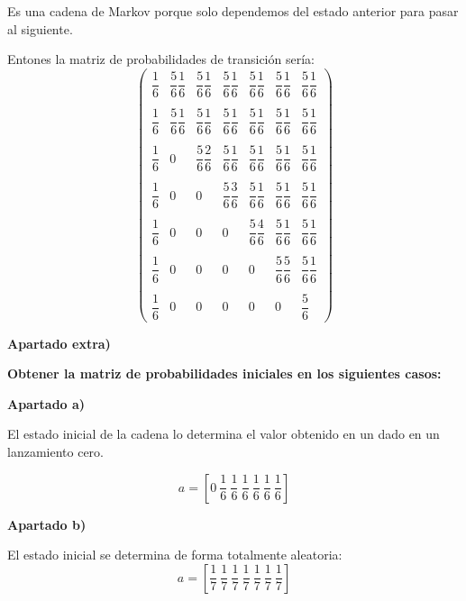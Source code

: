 \documentclass[openany]{book}
\begin{document}
\begin{exercise}
    Es una cadena de Markov porque solo dependemos del estado anterior para pasar al siguiente.

    Entones la matriz de probabilidades de transición sería:
    $$
    \begin{pmatrix} 
    \dfrac{1}{6} & \dfrac{5}{6}\dfrac{1}{6} & \dfrac{5}{6}\dfrac{1}{6} & \dfrac{5}{6}\dfrac{1}{6}& \dfrac{5}{6}\dfrac{1}{6}& \dfrac{5}{6}\dfrac{1}{6} & \dfrac{5}{6}\dfrac{1}{6}\\ \\
    \dfrac{1}{6} & \dfrac{5}{6}\dfrac{1}{6} & \dfrac{5}{6}\dfrac{1}{6} & \dfrac{5}{6}\dfrac{1}{6} & \dfrac{5}{6}\dfrac{1}{6} & \dfrac{5}{6}\dfrac{1}{6} & \dfrac{5}{6}\dfrac{1}{6} \\ \\
    \dfrac{1}{6} & 0 & \dfrac{5}{6}\dfrac{2}{6} & \dfrac{5}{6}\dfrac{1}{6} & \dfrac{5}{6}\dfrac{1}{6} & \dfrac{5}{6}\dfrac{1}{6} & \dfrac{5}{6}\dfrac{1}{6}\\ \\ 
    \dfrac{1}{6} & 0 & 0 & \dfrac{5}{6}\dfrac{3}{6} & \dfrac{5}{6}\dfrac{1}{6} & \dfrac{5}{6}\dfrac{1}{6} & \dfrac{5}{6}\dfrac{1}{6} \\ \\
    \dfrac{1}{6} & 0 & 0 & 0 & \dfrac{5}{6}\dfrac{4}{6} & \dfrac{5}{6}\dfrac{1}{6} & \dfrac{5}{6}\dfrac{1}{6}\\ \\ 
    \dfrac{1}{6} & 0 & 0 & 0 & 0 & \dfrac{5}{6} \dfrac{5}{6} & \dfrac{5}{6}\dfrac{1}{6} \\ \\ 
    \dfrac{1}{6} & 0 & 0 & 0 & 0 & 0 & \dfrac{5}{6}
    \end{pmatrix}  $$
    
    \begin{flushright}
    \textbf{Apartado extra)}
\end{flushright}

\textbf{Obtener la matriz de probabilidades iniciales en los siguientes casos:}

\begin{flushright}
    \textbf{Apartado a)}
\end{flushright}
El estado inicial de la cadena lo determina el valor obtenido en un dado en un lanzamiento cero.

$$ a = \left[ 0 \ \dfrac{1}{6} \ \dfrac{1}{6} \ \dfrac{1}{6} \ \dfrac{1}{6} \ \dfrac{1}{6} \ \dfrac{1}{6} \right] $$

\begin{flushright}
    \textbf{Apartado b)}
\end{flushright}
El estado inicial se determina de forma totalmente aleatoria:
$$ a = \left[ \dfrac{1}{7} \ \dfrac{1}{7} \ \dfrac{1}{7} \ \dfrac{1}{7} \ \dfrac{1}{7} \ \dfrac{1}{7} \ \dfrac{1}{7} \right] $$



\end{exercise}
\end{document}
